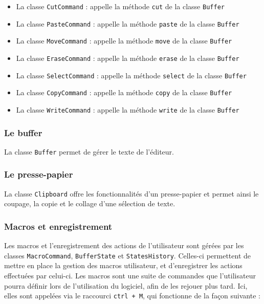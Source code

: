 \documentclass[a4paper]{article}
\begin{document}
			\begin{itemize}
				\item La classe \texttt{CutCommand} : appelle la méthode \texttt{cut} de la classe \texttt{Buffer}

				\item La classe \texttt{PasteCommand} : appelle la méthode \texttt{paste} de la classe \texttt{Buffer}

				\item La classe \texttt{MoveCommand} : appelle la méthode \texttt{move} de la classe \texttt{Buffer}

				\item La classe \texttt{EraseCommand} : appelle la méthode \texttt{erase} de la classe \texttt{Buffer}

				\item La classe \texttt{SelectCommand} : appelle la méthode \texttt{select} de la classe \texttt{Buffer}

				\item La classe \texttt{CopyCommand} : appelle la méthode \texttt{copy} de la classe \texttt{Buffer}

				\item La classe \texttt{WriteCommand} : appelle la méthode \texttt{write} de la classe \texttt{Buffer}
			\end{itemize}

			\subsubsection{Le buffer}

			La classe \texttt{Buffer} permet de gérer le texte de l'éditeur.

			\subsubsection{Le presse-papier}

			La classe \texttt{Clipboard} offre les fonctionnalités d'un presse-papier et permet ainsi le coupage, la copie et le collage d'une sélection de texte.

			\subsubsection{Macros et enregistrement}

			Les macros et l'enregistrement des actions de l'utilisateur sont gérées par les classes \texttt{MacroCommand}, \texttt{BufferState} et \texttt{StatesHistory}. Celles-ci permettent de mettre en place la gestion des macros utilisateur, et d’enregistrer les actions effectuées par celui-ci. Les macros sont une suite de commandes que l’utilisateur pourra définir lors de l’utilisation du logiciel, afin de les rejouer plus tard. Ici, elles sont appelées via le raccourci \texttt{ctrl + M}, qui fonctionne de la façon suivante :
\end{document}
